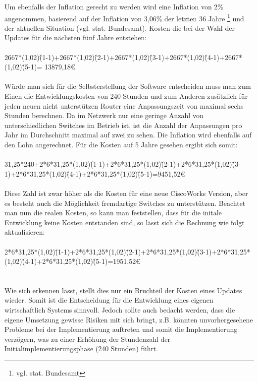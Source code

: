 Um ebenfalls der Inflation gerecht zu werden wird eine Inflation von 2\% angenommen, basierend auf der Inflation von 3,06\% der letzten 36 Jahre \footnote{vgl. stat. Bundesamt} und der aktuellen Situation (vgl. stat. Bundesamt).
Kosten die bei der Wahl der Updates für die nächsten fünf Jahre entstehen:\\
\\
2667*(1,02)\^(1-1)+2667*(1,02)\^(2-1)+2667*(1,02)\^(3-1)+2667*(1,02)\^(4-1)+2667*(1,02)\^(5-1)=
13879,18€\\
\\
Würde man sich für die Selbsterstellung der Software entscheiden muss man zum Einen die Entwicklungskosten von 240 Stunden und zum Anderen zusätzlich für jeden neuen nicht unterstützen Router eine Anpassungszeit von maximal sechs Stunden berechnen.
Da im Netzwerk nur eine geringe Anzahl von unterschiedlichen Switches im Betrieb ist, ist die Anzahl der Anpassungen pro Jahr im Durchschnitt maximal auf zwei zu sehen.
Die Inflation wird ebenfalls auf den Lohn angerechnet. Für die Kosten auf 5 Jahre gesehen ergibt sich somit:\\
\\
31,25*240+2*6*31,25*(1,02)\^(1-1)+2*6*31,25*(1,02)\^(2-1)+2*6*31,25*(1,02)\^(3-1)+2*6*31,25*(1,02)\^(4-1)+2*6*31,25*(1,02)\^(5-1)=9451,52€\\
\\
Diese Zahl ist zwar höher als die Kosten für eine neue CiscoWorks Version, aber es besteht auch die Möglichkeit fremdartige Switches zu unterstützen.
Beachtet man nun die realen Kosten, so kann man feststellen, dass für die initale Entwicklung keine Kosten entstanden sind, so lässt sich die Rechnung wie folgt aktualisieren:\\
\\
2*6*31,25*(1,02)\^(1-1)+2*6*31,25*(1,02)\^(2-1)+2*6*31,25*(1,02)\^(3-1)+2*6*31,25*(1,02)\^(4-1)+2*6*31,25*(1,02)\^(5-1)=1951,52€\\
\\
\\
Wie sich erkennen lässt, stellt dies nur ein Bruchteil der Kosten eines Updates wieder.
Somit ist die Entscheidung für die Entwicklung eines eigenen wirtschaftlich Systems sinnvoll.
Jedoch sollte auch bedacht werden, dass die eigene Umsetzung gewisse Risiken mit sich bringt, z.B. könnten unvorhergesehene Probleme bei der Implementierung auftreten und somit die Implementierung verzögern, was zu einer Erhöhung der Stundenzahl der Initialimplementierungsphase (240 Stunden) führt.\\